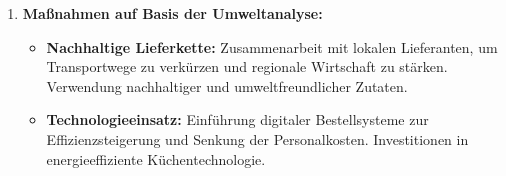 {\begin{enumerate}[label=(\alph*)]
\begin{itemize}
        \item \textbf{Sozialer Bereich:}
        \begin{itemize}
            \item Wie reagieren die Anwohner und die lokale Bevölkerung auf ein neues Restaurant?
            \item Welche Erwartungen haben Kunden an das Angebot (z. B. vegane Optionen, nachhaltige Verpackungen)?
        \end{itemize}

        \item \textbf{Technologischer Bereich:}
        \begin{itemize}
            \item Wie können Selbstbedienungskioske und digitale Bestellsysteme eingesetzt werden?
            \item Welche Innovationen in der Lebensmitteltechnologie könnten genutzt werden?
        \end{itemize}

        \item \textbf{Ökologischer Bereich:}
        \begin{itemize}
            \item Wie können Verpackungsmaterialien nachhaltiger gestaltet werden?
            \item Wie kann der CO₂-Ausstoß durch Transport und Produktion reduziert werden?
        \end{itemize}

        \item \textbf{Rechtlicher Bereich:}
        \begin{itemize}
            \item Welche Steuern und Abgaben müssen entrichtet werden?
            \item Welche Vorschriften gelten für die Müllentsorgung und Hygiene?
        \end{itemize}
    \end{itemize}

    \item \textbf{Maßnahmen auf Basis der Umweltanalyse:}
    \begin{itemize}
        \item \textbf{Nachhaltige Lieferkette:}
        Zusammenarbeit mit lokalen Lieferanten, um Transportwege zu verkürzen und regionale Wirtschaft zu stärken. Verwendung nachhaltiger und umweltfreundlicher Zutaten.

        \item \textbf{Technologieeinsatz:}
        Einführung digitaler Bestellsysteme zur Effizienzsteigerung und Senkung der Personalkosten. Investitionen in energieeffiziente Küchentechnologie.


\end{itemize}
\end{enumerate}}
